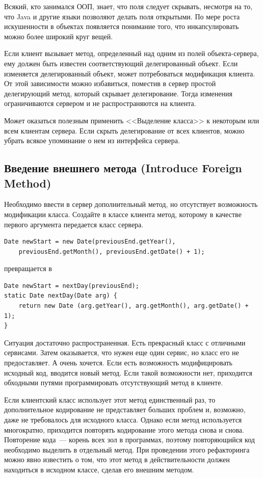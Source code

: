 \documentclass{../../text-style}
\begin{document}
Всякий, кто занимался ООП, знает, что поля следует скрывать, несмотря на то, что Java и другие языки позволяют делать поля открытыми. По мере роста искушенности в объектах появляется понимание того, что инкапсулировать можно более широкий круг вещей.

Если клиент вызывает метод, определенный над одним из полей объекта-сервера, ему должен быть известен соответствующий делегированный объект. Если изменяется делегированный объект, может потребоваться модификация клиента. От этой зависимости можно избавиться, поместив в сервер простой делегирующий метод, который скрывает делегирование. Тогда изменения ограничиваются сервером и не распространяются на клиента.

Может оказаться полезным применить <<Выделение класса>> к некоторым или всем клиентам сервера. Если скрыть делегирование от всех клиентов, можно убрать всякое упоминание о нем из интерфейса сервера.

\subsection{Введение внешнего метода (Introduce Foreign Method)}

Необходимо ввести в сервер дополнительный метод, но отсутствует возможность модификации класса. Создайте в классе клиента метод, которому в качестве первого аргумента передается класс сервера.

\begin{verbatim}
Date newStart = new Date(previousEnd.getYear(),
    previousEnd.getMonth(), previousEnd.getDate() + 1);
\end{verbatim}

превращается в 

\begin{verbatim}
Date newStart = nextDay(previousEnd);
static Date nextDay(Date arg) {
    return new Date (arg.getYear(), arg.getMonth(), arg.getDate() + 1);
}
\end{verbatim}

Ситуация достаточно распространенная. Есть прекрасный класс с отличными сервисами. Затем оказывается, что нужен еще один сервис, но класс его не предоставляет. А очень хочется. Если есть возможность модифицировать исходный код, вводится новый метод. Если такой возможности нет, приходится обходными путями программировать отсутствующий метод в клиенте.

Если клиентский класс использует этот метод единственный раз, то дополнительное кодирование не представляет больших проблем и, возможно, даже не требовалось для исходного класса. Однако если метод используется многократно, приходится повторять кодирование этого метода снова и снова. Повторение кода~--- корень всех зол в программах, поэтому повторяющийся код необходимо выделить в отдельный метод. При проведении этого рефакторинга можно явно известить о том, что этот метод в действительности должен находиться в исходном классе, сделав его внешним методом.
\end{document}
